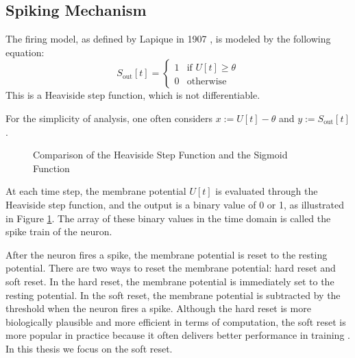     \subsection{Spiking Mechanism}
    \label{subsec:lif_spiking}
        The firing model, as defined by Lapique in 1907 \cite{lapicque1907louis}, is modeled by the following equation:
        \begin{equation}
            S_{\text{out}}[t] = \begin{cases}
                1 & \text{if } U[t] \geq \theta \\
                0 & \text{otherwise}
            \end{cases}
        \end{equation}
        This is a Heaviside step function, which is not differentiable. 

        For the simplicity of analysis, one often considers $x := U[t] - \theta$ and $y := S_{\text{out}}[t]$.
        \begin{figure}[!htpb]
            \centering
            \caption{Comparison of the Heaviside Step Function and the Sigmoid Function}
            \label{fig:heaviside_sigmoid}
        \end{figure}
        At each time step, the membrane potential $U[t]$ is evaluated through the Heaviside step function, and the output is a binary value of 0 or 1, as illustrated in Figure \ref{fig:heaviside_sigmoid}. The array of these binary values in the time domain is called the spike train of the neuron. 

        After the neuron fires a spike, the membrane potential is reset to the resting potential. There are two ways to reset the membrane potential: hard reset and soft reset. In the hard reset, the membrane potential is immediately set to the resting potential. In the soft reset, the membrane potential is subtracted by the threshold when the neuron fires a spike. Although the hard reset is more biologically plausible and more efficient in terms of computation, the soft reset is more popular in practice because it often delivers better performance in training \cite{10242251}. In this thesis we focus on the soft reset.

